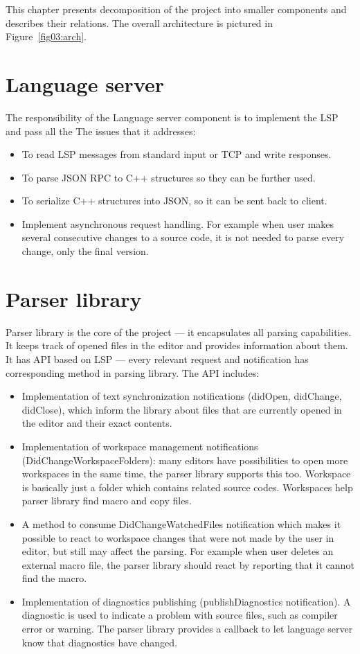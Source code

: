 This chapter presents decomposition of the project into smaller components and describes their relations. The overall architecture is pictured in Figure~\ref{fig03:arch}.

\section{Language server}

The responsibility of the Language server component is to implement the LSP and pass all the  The issues that it addresses:

\begin{itemize}
    \item To read LSP messages from standard input or TCP and write responses.
    \item To parse JSON RPC to C++ structures so they can be further used.
    \item To serialize C++ structures into JSON, so it can be sent back to client.
    \item Implement asynchronous request handling. For example when user makes several consecutive changes to a source code, it is not needed to parse every change, only the final version.
\end{itemize}

\section{Parser library}

Parser library is the core of the project --- it encapsulates all parsing capabilities. It keeps track of opened files in the editor and provides information about them. It has API based on LSP --- every relevant request and notification has corresponding method in parsing library. The API includes:

\begin{itemize}
	\item Implementation of text synchronization notifications (didOpen, didChange, didClose), which inform the library about files that are currently opened in the editor and their exact contents.
	\item Implementation of workspace management notifications (DidChangeWorkspaceFolders): many editors have possibilities to open more workspaces in the same time, the parser library supports this too. Workspace is basically just a folder which contains related source codes. Workspaces help parser library find macro and copy files.
	\item A method to consume DidChangeWatchedFiles notification which makes it possible to react to workspace changes that were not made by the user in editor, but still may affect the parsing. For example when user deletes an external macro file, the parser library should react by reporting that it cannot find the macro.
	\item Implementation of diagnostics publishing (publishDiagnostics notification). A diagnostic is used to indicate a problem with source files, such as compiler error or warning. The parser library provides a callback to let language server know that diagnostics have changed.
	
\end{itemize}


